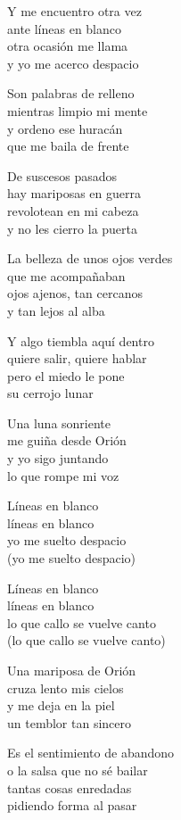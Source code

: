 \begin{lyrics}

Y me encuentro otra vez\\
ante líneas en blanco\\
otra ocasión me llama\\
y yo me acerco despacio

Son palabras de relleno\\
mientras limpio mi mente\\
y ordeno ese huracán\\
que me baila de frente

De suscesos pasados\\
hay mariposas en guerra\\
revolotean en mi cabeza\\
y no les cierro la puerta

La belleza de unos ojos verdes\\
que me acompañaban\\
ojos ajenos, tan cercanos\\
y tan lejos al alba

Y algo tiembla aquí dentro\\
quiere salir, quiere hablar\\
pero el miedo le pone\\
su cerrojo lunar

Una luna sonriente\\
me guiña desde Orión\\
y yo sigo juntando\\
lo que rompe mi voz

Líneas en blanco\\
líneas en blanco\\
yo me suelto despacio\\
(yo me suelto despacio)

Líneas en blanco\\
líneas en blanco\\
lo que callo se vuelve canto\\
(lo que callo se vuelve canto)

Una mariposa de Orión\\
cruza lento mis cielos\\
y me deja en la piel\\
un temblor tan sincero

Es el sentimiento de abandono\\
o la salsa que no sé bailar\\
tantas cosas enredadas\\
pidiendo forma al pasar


\end{lyrics}
